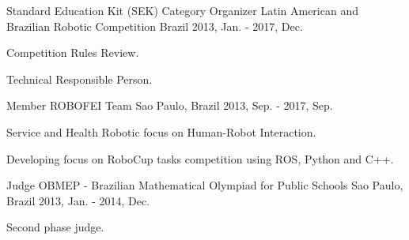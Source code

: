 \begin{cventries}

  \cventry
    {Standard Education Kit (SEK) Category Organizer} %
    {Latin American and Brazilian Robotic Competition} %
    {Brazil} %
    {2013, Jan. - 2017, Dec.} %
    {
      \begin{cvitems} %
        \item {Competition Rules Review.}
        \item {Technical Responsible Person.}
      \end{cvitems}
    }

  \cventry
    {Member} %
    {ROBOFEI Team} %
    {Sao Paulo, Brazil} %
    {2013, Sep. - 2017, Sep.} %
    {
      \begin{cvitems} %
        \item {Service and Health Robotic focus on Human-Robot Interaction.}
        \item {Developing focus on RoboCup \@home tasks competition using ROS, Python and C++.}
      \end{cvitems}
    }

  \cventry
    {Judge} %
    {OBMEP - Brazilian Mathematical Olympiad for Public Schools} %
    {Sao Paulo, Brazil} %
    {2013, Jan. - 2014, Dec.} %
    {
      \begin{cvitems} %
        \item {Second phase judge.}
      \end{cvitems}
    }

\end{cventries}

